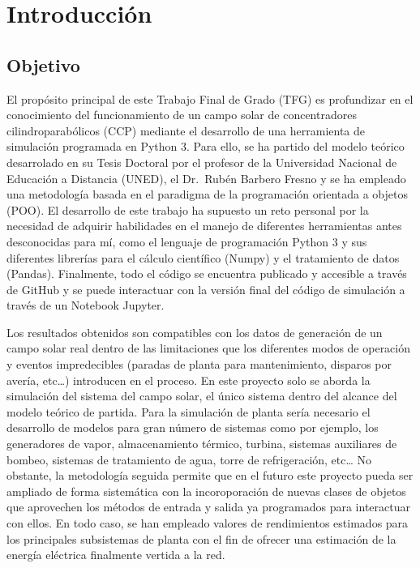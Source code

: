 \chapter{Introducción}
\label{introduccion}

\section{Objetivo}
El propósito principal de este Trabajo Final de Grado (TFG) es profundizar en el conocimiento del funcionamiento de un campo solar de concentradores cilindroparabólicos (CCP) mediante el desarrollo de una herramienta de simulación programada en Python 3. Para ello, se ha partido del modelo teórico desarrolado en su Tesis Doctoral por el profesor de la Universidad Nacional de Educación a Distancia (UNED), el Dr.~Rubén Barbero Fresno y se ha empleado una metodología basada en el paradigma de la programación orientada a objetos (POO). El desarrollo de este trabajo ha supuesto un reto personal por la necesidad de adquirir habilidades en el manejo de diferentes herramientas antes desconocidas para mí, como el lenguaje de programación Python 3 y sus diferentes librerías para el cálculo científico (Numpy) y el tratamiento de datos (Pandas). Finalmente, todo el código se encuentra publicado y accesible a través de GitHub y se puede interactuar con la versión final del código de simulación a través de un Notebook Jupyter.

Los resultados obtenidos son compatibles con los datos de generación de un campo solar real dentro de las limitaciones que los diferentes modos de operación y eventos impredecibles (paradas de planta para mantenimiento, disparos por avería, etc\ldots{}) introducen en el proceso. En este proyecto solo se aborda la simulación del sistema del campo solar, el único sistema dentro del alcance del modelo teórico de partida. Para la simulación de planta sería necesario el desarrollo de
modelos para gran número de sistemas como por ejemplo, los generadores de vapor, almacenamiento térmico, turbina, sistemas auxiliares de bombeo, sistemas de tratamiento de agua, torre de refrigeración, etc\ldots{} No obstante, la metodología seguida permite que en el futuro este proyecto pueda ser ampliado de forma sistemática con la incoroporación de nuevas clases de objetos que aprovechen los métodos de entrada y salida ya programados para interactuar con ellos. En todo caso, se han empleado valores de rendimientos estimados para los principales subsistemas de planta con el fin de ofrecer una estimación de la energía eléctrica finalmente vertida a la red.


